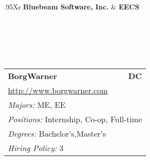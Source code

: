 \documentclass[twoside]{article}
\begin{document}
\begin{center}
\begin{multicols}{3}
\begin{FlushLeft}
\begin{minipage}{.9\columnwidth}
\end{minipage}
 
\begin{minipage}{.9\columnwidth}\begin{tabularx}{.95\columnwidth}{Xr}
                 {\Large\bf Bluebeam Software, Inc.} & {\Large\bf EECS}\\
    \\
    \\
    \\
    \\
    \\
    \end{tabularx}
    
\end{minipage}
 
\begin{minipage}{.9\columnwidth}\begin{tabularx}{.95\columnwidth}{Xr}
                 {\Large\bf BorgWarner} & {\Large\bf DC}\\
    \multicolumn{2}{p{.95\columnwidth}}{\url{http://www.borgwarner.com}}\\
    \multicolumn{2}{p{.95\columnwidth}}{\emph{Majors:} ME, EE}\\
    \multicolumn{2}{p{.95\columnwidth}}{\emph{Positions:} Internship, Co-op, Full-time}\\
    \multicolumn{2}{p{.95\columnwidth}}{\emph{Degrees:} Bachelor's,Master's}\\
    \multicolumn{2}{p{.95\columnwidth}}{\emph{Hiring Policy:} 3}\\
    \end{tabularx}
    
\end{minipage}
 

\end{FlushLeft}
\end{multicols}
\end{center}
\end{document}
